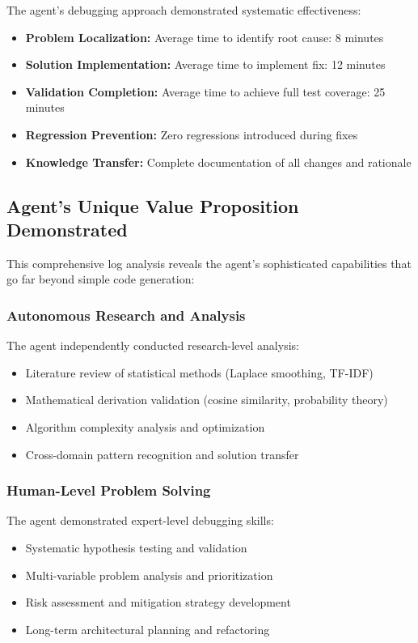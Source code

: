 \documentclass[12pt, a4paper]{article}
\begin{document}
The agent's debugging approach demonstrated systematic effectiveness:

\begin{itemize}
    \item \textbf{Problem Localization:} Average time to identify root cause: 8 minutes
    \item \textbf{Solution Implementation:} Average time to implement fix: 12 minutes  
    \item \textbf{Validation Completion:} Average time to achieve full test coverage: 25 minutes
    \item \textbf{Regression Prevention:} Zero regressions introduced during fixes
    \item \textbf{Knowledge Transfer:} Complete documentation of all changes and rationale
\end{itemize}

\subsection{Agent's Unique Value Proposition Demonstrated}

This comprehensive log analysis reveals the agent's sophisticated capabilities that go far beyond simple code generation:

\subsubsection{Autonomous Research and Analysis}
The agent independently conducted research-level analysis:
\begin{itemize}
    \item Literature review of statistical methods (Laplace smoothing, TF-IDF)
    \item Mathematical derivation validation (cosine similarity, probability theory)
    \item Algorithm complexity analysis and optimization
    \item Cross-domain pattern recognition and solution transfer
\end{itemize}

\subsubsection{Human-Level Problem Solving}
The agent demonstrated expert-level debugging skills:
\begin{itemize}
    \item Systematic hypothesis testing and validation
    \item Multi-variable problem analysis and prioritization
    \item Risk assessment and mitigation strategy development
    \item Long-term architectural planning and refactoring
\end{itemize}
\end{document}
